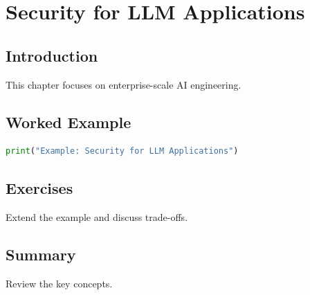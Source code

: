 \chapter{Security for LLM Applications}
\label{chap:vol10-12}



\section{Introduction}
This chapter focuses on enterprise-scale AI engineering.

\section{Worked Example}
\begin{lstlisting}[language=Python]
print("Example: Security for LLM Applications")
\end{lstlisting}

\section{Exercises}
\begin{exercise}
Extend the example and discuss trade-offs.
\end{exercise}

\section{Summary}
Review the key concepts.
